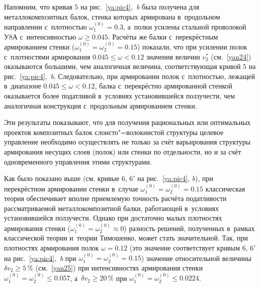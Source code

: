 Напомним, что кривая $5$ на рис.~\ref{ya:pic4},~{\sl b} была получена для металлокомпозитных балок, 
стенка которых армирована в~продольном направлении с~плотностью $\omega_1^{(0)}=0.3$, 
а~полки усилены стальной проволокой У8А с~интенсивностью $\omega\ge0.045$. 
Расчёты же балки с~перекрёстным армированием стенки ($\omega_1^{(0)}=\omega_2^{(0)}=0.15$) 
показали, что при усилении полок с~плотностями армирования $0.045\le\omega<0.12$ значения величин $v_2^*$ 
(см.~\eqref{yan24}) оказываются большими, чем аналогичная величина, соответствующая кривой $5$ 
на рис.~\ref{ya:pic4},~{\sl b}. 
Следовательно, при армировании полок с~плотностью, лежащей в~диапазоне $0.045\le\omega<0.12$, 
балка с~перекрёстно армированной стенкой оказывается более податливой в~условиях установившейся ползучести, 
чем аналогичная конструкция с~продольным армированием стенки.

Эти результаты показывают, что для получения рациональных или оптимальных проектов композитных балок слоисто"=волокнистой структуры целевое управление необходимо осуществлять не только за счёт варьирования структуры армирования несущих слоев (полок) или стенки по отдельности, но и за счёт одновременного управления этими структурами.

Как было показано выше (см. кривые $6$, $6'$ на рис.~\ref{ya:pic4}, {\sl b}), 
при перекрёстном армировании стенки в~случае $\omega_1^{(0)}=\omega_2^{(0)}=0.15$ 
классическая теория обеспечивает вполне приемлемую точность расчёта податливости рассматриваемой металлокомпозитной балки,
работающей в~условиях установившейся ползучести. 
Однако при достаточно малых плотностях армирования стенки ($\omega_1^{(0)}=\omega_2^{(0)}\approx0$) 
разность решений, полученных в~рамках классической теории и~теории Тимошенко, может стать значительной. 
Так, при плотностях армирования полок $\omega=0.12$ 
(это значение соответствует кривым $6$, $6'$ на рис.~\ref{ya:pic4},~{\sl b} 
при $\omega_1^{(0)}=\omega_2^{(0)}=0.15$) значение относительной величины $\delta v_2\ge5\,\%$ (см.~\eqref{yan25}) при интенсивностях армирования стенки $\omega_1^{(0)}=\omega_2^{(0)}\le0.057$, 
а~$\delta v_2\ge20\,\%$ при $\omega_1^{(0)}=\omega_2^{(0)}\le0.0224$.

